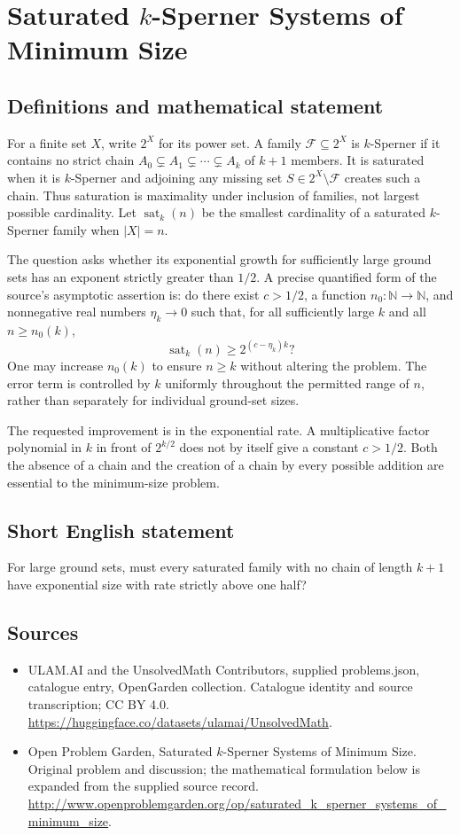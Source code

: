 \documentclass[11pt,a4paper]{article}
\begin{document}
\section*{Saturated $k$-Sperner Systems of Minimum Size}\label{statement}

\subsection{Definitions and mathematical statement}
For a finite set $X$, write $2^X$ for its power set. A family
$\mathcal F\subseteq2^X$ is $k$-Sperner if it contains no strict chain
$A_0\subsetneq A_1\subsetneq\cdots\subsetneq A_k$ of $k+1$ members.
It is saturated when it is $k$-Sperner and adjoining any missing set
$S\in2^X\setminus\mathcal F$ creates such a chain. Thus saturation is
maximality under inclusion of families, not largest possible cardinality.
Let $\operatorname{sat}_k(n)$ be the smallest cardinality of a saturated
$k$-Sperner family when $|X|=n$.

The question asks whether its exponential growth for sufficiently large
ground sets has an exponent strictly greater than $1/2$. A precise
quantified form of the source's asymptotic assertion is: do there exist
$c>1/2$, a function $n_0:\mathbb N\to\mathbb N$, and nonnegative real
numbers $\eta_k\to0$ such that, for all sufficiently large $k$ and all
$n\ge n_0(k)$,
\[
 \operatorname{sat}_k(n)\ge 2^{(c-\eta_k)k}?
\]
One may increase $n_0(k)$ to ensure $n\ge k$ without altering the problem.
The error term is controlled by $k$ uniformly throughout the permitted
range of $n$, rather than separately for individual ground-set sizes.

The requested improvement is in the exponential rate. A multiplicative
factor polynomial in $k$ in front of $2^{k/2}$ does not by itself give a
constant $c>1/2$. Both the absence of a chain and the creation of a chain
by every possible addition are essential to the minimum-size problem.
\subsection{Short English statement}
For large ground sets, must every saturated family with no chain of length $k+1$ have exponential size with rate strictly above one half?
\subsection{Sources}
\begin{itemize}
\item[S1] ULAM.AI and the UnsolvedMath Contributors, supplied problems.json, catalogue entry, OpenGarden collection. Catalogue identity and source transcription; CC BY 4.0.
\url{https://huggingface.co/datasets/ulamai/UnsolvedMath}.
\item[S2] Open Problem Garden, Saturated $k$-Sperner Systems of Minimum Size. Original problem and discussion; the mathematical formulation below is expanded from the supplied source record.
\url{http://www.openproblemgarden.org/op/saturated_k_sperner_systems_of_minimum_size}.
\end{itemize}
\end{document}
